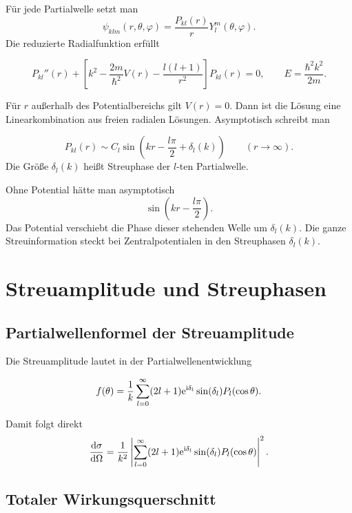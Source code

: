 Für jede Partialwelle setzt man
\[
    \psi_{klm}(r,\theta,\varphi)
    =\frac{P_{kl}(r)}{r}Y_l^m(\theta,\varphi).
\]
Die reduzierte Radialfunktion erfüllt
\begin{formulabox}
\[
    P_{kl}''(r)+\left[k^2-\frac{2m}{\hbar^2}V(r)-\frac{l(l+1)}{r^2}\right]P_{kl}(r)=0,
    \qquad
    E=\frac{\hbar^2k^2}{2m}.
\]
\end{formulabox}

Für \(r\) außerhalb des Potentialbereichs gilt \(V(r)=0\). Dann ist die Lösung eine Linearkombination aus freien radialen Lösungen. Asymptotisch schreibt man
\begin{definitionbox}
\[
    P_{kl}(r)
    \sim C_l\sin\left(kr-\frac{l\pi}{2}+\delta_l(k)\right)
    \qquad (r\to\infty).
\]
Die Größe \(\delta_l(k)\) heißt Streuphase der \(l\)-ten Partialwelle.
\end{definitionbox}

\begin{conceptbox}
Ohne Potential hätte man asymptotisch
\[
    \sin\left(kr-\frac{l\pi}{2}\right).
\]
Das Potential verschiebt die Phase dieser stehenden Welle um \(\delta_l(k)\). Die ganze Streuinformation steckt bei Zentralpotentialen in den Streuphasen \(\delta_l(k)\).
\end{conceptbox}

\section{Streuamplitude und Streuphasen}

\subsection{Partialwellenformel der Streuamplitude}

Die Streuamplitude lautet in der Partialwellenentwicklung
\begin{formulabox}
\[
    f(\theta)
    =\frac{1}{k}\sum_{l=0}^{\infty}(2l+1)\mathrm{e}^{\mathrm{i}\delta_l}\sin(\delta_l)P_l(\cos\theta).
\]
\end{formulabox}

Damit folgt direkt
\[
    \frac{\mathrm{d}\sigma}{\mathrm{d}\Omega}
    =\frac{1}{k^2}\left|\sum_{l=0}^{\infty}(2l+1)\mathrm{e}^{\mathrm{i}\delta_l}\sin(\delta_l)P_l(\cos\theta)\right|^2.
\]

\subsection{Totaler Wirkungsquerschnitt}

